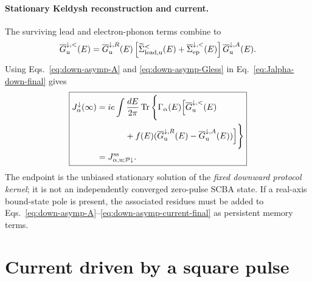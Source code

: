 \documentclass[
 reprint,
 superscriptaddress,
 amsmath,amssymb,
 aps,prb,
 longbibliography,
 floatfix
]{revtex4-2}
\newcommand{\ep}{\mathrm{ep}}
\newcommand{\barSigma}{\overline{\Sigma}}
\begin{document}
\paragraph{Stationary Keldysh reconstruction and current.}
The surviving lead and electron-phonon terms combine to
\begin{equation}
\overline G_{\mathrm u}^{\downarrow,<}(E)
=
\overline G_{\mathrm u}^{\downarrow,R}(E)
\left[
\widetilde\Sigma_{\rm lead,u}^{<}(E)
+
\barSigma_{\ep}^{\downarrow,<}(E)
\right]
\overline G_{\mathrm u}^{\downarrow,A}(E).
\label{eq:down-asymp-Gless}
\end{equation}
Using Eqs.~\eqref{eq:down-asymp-A} and \eqref{eq:down-asymp-Gless} in Eq.~\eqref{eq:Jalpha-down-final} gives
\begin{equation}
\boxed{
\begin{aligned}
J_\alpha^\downarrow(\infty)
={}&
ie\int\frac{dE}{2\pi}
\operatorname{Tr}\Bigg\{
\Gamma_\alpha(E)
\Big[
\overline G_{\mathrm u}^{\downarrow,<}(E)
\\
&\qquad+
f(E)
(\overline G_{\mathrm u}^{\downarrow,R}(E)
-
\overline G_{\mathrm u}^{\downarrow,A}(E))
\Big]
\Bigg\}
\\
={}&
J_{\alpha,\mathrm u;\mathcal P\downarrow}^{\rm ss}.
\end{aligned}}
\label{eq:down-asymp-current-final}
\end{equation}
The endpoint is the unbiased stationary solution of the \emph{fixed downward protocol kernel}; it is not an independently converged zero-pulse SCBA state. If a real-axis bound-state pole is present, the associated residues must be added to Eqs.~\eqref{eq:down-asymp-A}--\eqref{eq:down-asymp-current-final} as persistent memory terms.

\section{Current driven by a square pulse}
\label{sec:square}
\end{document}
